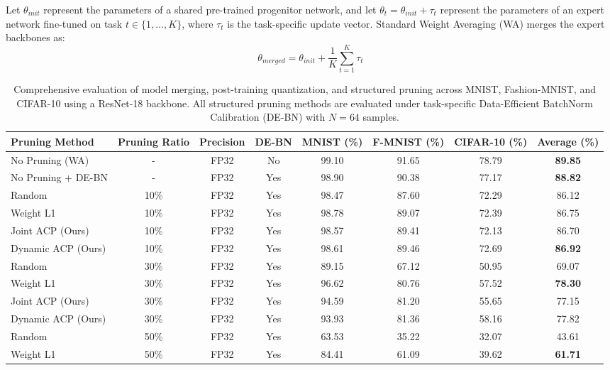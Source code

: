 \documentclass{article}
\theoremstyle{plain}
\theoremstyle{definition}
\theoremstyle{remark}
\begin{document}
Let $\theta_{init}$ represent the parameters of a shared pre-trained progenitor network, and let $\theta_t = \theta_{init} + \tau_t$ represent the parameters of an expert network fine-tuned on task $t \in \{1, \dots, K\}$, where $\tau_t$ is the task-specific update vector. Standard Weight Averaging (WA) merges the expert backbones as:
\begin{equation}
    \theta_{merged} = \theta_{init} + \frac{1}{K} \sum_{t=1}^K \tau_t
\end{equation}

\begin{table}[t]
\caption{Comprehensive evaluation of model merging, post-training quantization, and structured pruning across MNIST, Fashion-MNIST, and CIFAR-10 using a ResNet-18 backbone. All structured pruning methods are evaluated under task-specific Data-Efficient BatchNorm Calibration (DE-BN) with $N = 64$ samples.}
\label{tab:main_results}
\vskip 0.15in
\begin{center}
\begin{small}
\setlength{\tabcolsep}{3.6pt}
\begin{tabular}{lccccccc}
\toprule
Pruning Method & Pruning Ratio & Precision & DE-BN & MNIST (\%) & F-MNIST (\%) & CIFAR-10 (\%) & Average (\%) \\
\midrule
No Pruning (WA) & - & FP32 & No & 99.10 & 91.65 & 78.79 & \textbf{89.85} \\
No Pruning + DE-BN & - & FP32 & Yes & 98.90 & 90.38 & 77.17 & \textbf{88.82} \\
\midrule
Random & 10\% & FP32 & Yes & 98.47 & 87.60 & 72.29 & 86.12 \\
Weight L1 & 10\% & FP32 & Yes & 98.78 & 89.07 & 72.39 & 86.75 \\
Joint ACP (Ours) & 10\% & FP32 & Yes & 98.57 & 89.41 & 72.13 & 86.70 \\
Dynamic ACP (Ours) & 10\% & FP32 & Yes & 98.61 & 89.46 & 72.69 & \textbf{86.92} \\
\midrule
Random & 30\% & FP32 & Yes & 89.15 & 67.12 & 50.95 & 69.07 \\
Weight L1 & 30\% & FP32 & Yes & 96.62 & 80.76 & 57.52 & \textbf{78.30} \\
Joint ACP (Ours) & 30\% & FP32 & Yes & 94.59 & 81.20 & 55.65 & 77.15 \\
Dynamic ACP (Ours) & 30\% & FP32 & Yes & 93.93 & 81.36 & 58.16 & 77.82 \\
\midrule
Random & 50\% & FP32 & Yes & 63.53 & 35.22 & 32.07 & 43.61 \\
Weight L1 & 50\% & FP32 & Yes & 84.41 & 61.09 & 39.62 & \textbf{61.71} \\

\end{tabular}
\end{small}
\end{center}
\end{table}
\end{document}
